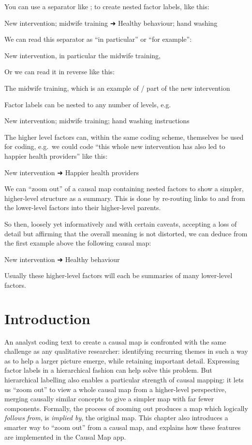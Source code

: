 \documentclass[
]{book}
\begin{document}
You can use a separator like ; to create nested factor labels, like this:

New intervention; midwife training ➜ Healthy behaviour; hand washing

We can read this separator as ``in particular'' or ``for example'':

New intervention, in particular the midwife training,

Or we can read it in reverse like this:

The midwife training, which is an example of / part of the new intervention

Factor labels can be nested to any number of levels, e.g.

New intervention; midwife training; hand washing instructions

The higher level factors can, within the same coding scheme, themselves be used for coding, e.g.~we could code ``this whole new intervention has also led to happier health providers'' like this:

New intervention ➜ Happier health providers

We can ``zoom out'' of a causal map containing nested factors to show a simpler, higher-level structure as a summary. This is done by re-routing links to and from the lower-level factors into their higher-level parents.

So then, loosely yet informatively and with certain caveats, accepting a loss of detail but affirming that the overall meaning is not distorted, we can deduce from the first example above the following causal map:

New intervention ➜ Healthy behaviour

Usually these higher-level factors will each be summaries of many lower-level factors.

\hypertarget{introduction}{%
\section{Introduction}\label{introduction}}

An analyst coding text to create a causal map is confronted with the same challenge as any qualitative researcher: identifying recurring themes in such a way as to help a larger picture emerge, while retaining important detail. Expressing factor labels in a hierarchical fashion can help solve this problem. But hierarchical labelling also enables a particular strength of causal mapping: it lets us ``zoom out'' to view a whole causal map from a higher-level perspective, merging causally similar concepts to give a simpler map with far fewer components. Formally, the process of zooming out produces a map which logically \emph{follows} \emph{from}, is \emph{implied by}, the original map. This chapter also introduces a smarter way to ``zoom out'' from a causal map, and explains how these features are implemented in the Causal Map app.
\end{document}
